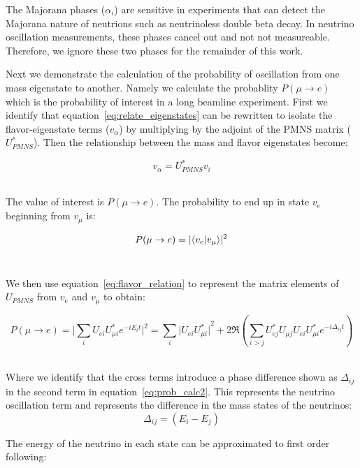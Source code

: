 The Majorana phases ($\alpha_{i}$) are sensitive in experiments that can detect the Majorana nature of neutrions such as neutrinoless double beta decay.
In neutrino oscillation measurements, these phases cancel out and not not measureable.
Therefore, we ignore these two phases for the remainder of this work.


Next we demonstrate the calculation of the probability of oscillation from one mass eigenstate to another.
Namely we calculate the probablity $P(\mu \rightarrow e)$ which is the probability of interest in a long beamline experiment.
First we identify that equation~\ref{eq:relate_eigenstates} can be rewritten to isolate the flavor-eigenstate terms ($v_{\alpha}$) by multiplying by the adjoint of the PMNS matrix ($U^{*}_{PMNS}$).
Then the relationship between the mass and flavor eigenstates become:

\begin{equation}
v_{\alpha} = U^{*}_{PMNS}v_{i}
\end{equation}
~\label{eq:flavor_relation}

The value of interest is $P(\mu \rightarrow e)$.
The probability to end up in state $v_{e}$ beginning from $v_{\mu}$ is:

\begin{equation}
P(\mu \rightarrow e) = \lvert \braket{ v_{e} | v_{\mu} }\rvert^{2}
\end{equation}
~\label{eq:prob_calc1}

We then use equation~\ref{eq:flavor_relation} to represent the matrix elements of $U_{PMNS}$ from $v_{e}$ and $v_{\mu}$  to obtain:

\begin{equation}
  P(\mu \rightarrow e)
  = \lvert \sum_{i} U_{e i} U^{*}_{\mu i} e^{-i E_{i}t}  \rvert^{2}
  = \sum_{i} {\lvert U_{ei}U^{*}_{\mu i} \rvert}^{2}
  +
  2 \Re( \sum_{i>j}  U^{*}_{ej}U_{\mu j}U_{ei}U^{*}_{\mu i} e^{-i \Delta_{ij}t} )
\end{equation}
~\label{eq:prob_calc2}

Where we identify that the cross terms introduce a phase difference shown as $\Delta_{ij}$ in the second term in equation~\ref{eq:prob_calc2}.
This represents the neutrino oscillation term and represents the difference in the mass states of the neutrinos:
\begin{equation}
\Delta_{ij} = (E_{i} - E_{j})
\end{equation}

The energy of the neutrino in each state can be approximated to first order following:

